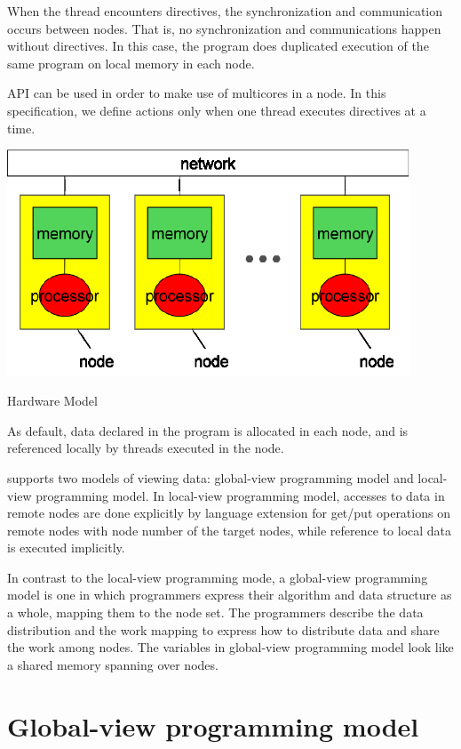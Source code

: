 When the thread encounters \XMP directives,
the synchronization and communication occurs between nodes. That is,
no synchronization and communications happen without directives. In
this case, the program does duplicated execution of the same program
on local memory in each node.

\OMP API can be used in order to
make use of multicores in a node. In this specification, we define
actions only when one thread executes \XMP directives at a
time.

\begin{myfigure}
\includegraphics[width=12cm]{figs/Fig1.eps}
  \caption{Hardware Model}\label{fig1}
\end{myfigure}

As default, data
declared in the program is allocated in each node, and is referenced
locally by threads executed in the node. 

\XMP supports two
models of viewing data: global-view programming model and local-view
programming model. In local-view programming model, accesses to data
in remote nodes are done explicitly by language extension for get/put
operations on remote nodes with node number of the target nodes, while
reference to local data is executed implicitly. 

In contrast to
the local-view programming mode, a global-view programming model is
one in which programmers express their algorithm and data structure as
a whole, mapping them to the node set. The programmers describe the
data distribution and the work mapping to express how to distribute
data and share the work among nodes. The variables in global-view
programming model look like a shared memory spanning over
nodes.

\section{Global-view programming model}

